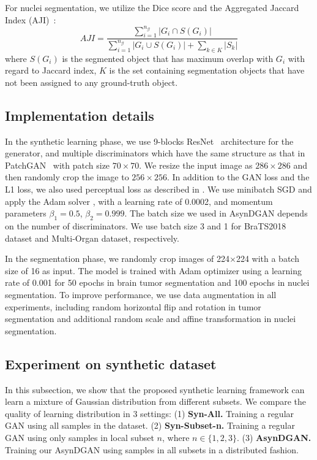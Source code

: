 For nuclei segmentation, we utilize the Dice score and the Aggregated Jaccard Index (AJI)~\cite{kumar2017dataset}:
\begin{equation}
AJI = \frac{\sum_{i=1}^{n_\mathcal{G}} |G_i \cap S(G_i)|}{\sum_{i=1}^{n_\mathcal{G}}|G_i \cup S(G_i)| + \sum_{k\in K}|S_k|}
\end{equation}
where $S(G_i)$ is the segmented object that has maximum overlap with $G_i$ with regard to Jaccard index, $K$ is the set containing segmentation objects that have not been assigned to any ground-truth object.

\subsection{Implementation details}
In the synthetic learning phase, we use 9-blocks ResNet~\cite{he2016deep} architecture for the generator, and multiple discriminators which have the same structure as that in PatchGAN~\cite{isola2016pix2pix} with patch size $70\times70$. We resize the input image as $286\times286$ and then randomly crop the image to $256\times256$. In addition to the GAN loss and the L1 loss, we also used perceptual loss as described in \cite{Johnson2016Perceptual}. We use minibatch SGD and apply the Adam solver \cite{kingma2014adam}, with a learning rate of 0.0002, and momentum parameters $\beta_1 = 0.5$, $\beta_2 = 0.999$. The batch size we used in AsynDGAN depends on the number of discriminators. We use batch size 3 and 1 for BraTS2018 dataset and Multi-Organ dataset, respectively.

In the segmentation phase, we randomly crop images of 224$\times$224 with a batch size of 16 as input. The model is trained with Adam optimizer using a learning rate of 0.001 for 50 epochs in brain tumor segmentation and 100 epochs in nuclei segmentation. To improve performance, we use data augmentation in all experiments, including random horizontal flip and rotation in tumor segmentation and additional random scale and affine transformation in nuclei segmentation.


\subsection{Experiment on synthetic dataset}
In this subsection, we show that the proposed synthetic learning framework can learn a mixture of Gaussian distribution from different subsets. We compare the quality of learning distribution in $3$ settings: (1) \textbf{Syn-All.} Training a regular GAN using all samples in the dataset.
(2) \textbf{Syn-Subset-n.} Training a regular GAN using only samples in local subset $n$, where $n\in\{1,2,3\}$. (3) \textbf{AsynDGAN.} Training our AsynDGAN using samples in all subsets in a distributed fashion.

